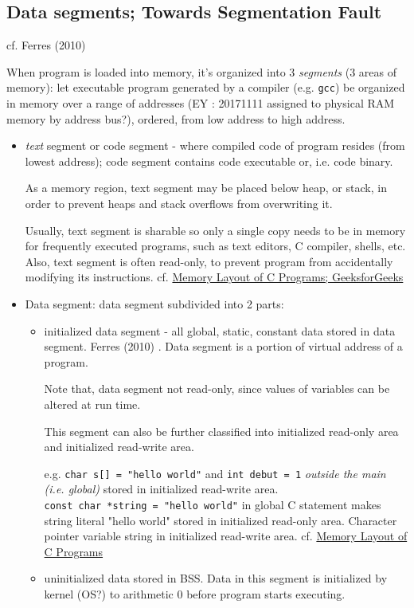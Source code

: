 \documentclass[10pt]{amsart}
\begin{document}
\begin{multicols*}{2}
\section{Data segments; Towards Segmentation Fault}

cf. Ferres (2010) \cite{Ferr2010}

When program is loaded into memory, it's organized into 3 \emph{segments} (3 areas of memory):  
let executable program generated by a compiler (e.g. \verb|gcc|) be organized in memory over a range of addresses (EY : 20171111 assigned to physical RAM memory by address bus?), ordered, from low address to high address.  
\begin{itemize}
	\item \emph{text} segment or code segment - where compiled code of program resides (from lowest address); code segment contains code executable or, i.e. code binary.  

	As a memory region, text segment may be placed below heap, or stack, in order to prevent heaps and stack overflows from overwriting it.  
	
	Usually, text segment is sharable so only a single copy needs to be in memory for frequently executed programs, such as text editors, C compiler, shells, etc.  Also, text segment is often read-only, to prevent program from accidentally modifying its instructions.  	
	cf. \href{http://www.geeksforgeeks.org/memory-layout-of-c-program/}{Memory Layout of C Programs; GeeksforGeeks}  
	\item Data segment:  data segment subdivided into 2 parts:
	\begin{itemize}
		\item initialized data segment - all global, static, constant data stored in data segment. Ferres (2010) \cite{Ferr2010}.  Data segment is a portion of virtual address of a program.  
		
		Note that, data segment not read-only, since values of variables can be altered at run time.  
		
		This segment can also be further classified into initialized read-only area and initialized read-write area.  
		
		e.g. \verb|char s[] = "hello world"| and \verb|int debut = 1| \emph{outside the main (i.e. global)} stored in initialized read-write area.  \\
		\verb|const char *string = "hello world"| in global C statement makes string literal "hello world" stored in initialized read-only area.  Character pointer variable string in initialized read-write area.  
		   cf. \href{http://www.geeksforgeeks.org/memory-layout-of-c-program/}{Memory Layout of C Programs}  
		\item uninitialized data stored in BSS.  Data in this segment is initialized by kernel (OS?) to arithmetic 0 before program starts executing.  
		

\end{itemize}
\end{itemize}
\end{multicols*}
\end{document}
